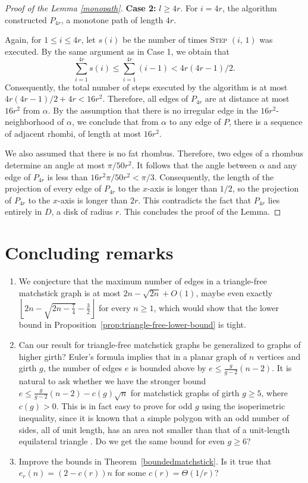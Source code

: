 \documentclass[12pt]{article}
\theoremstyle{plain}
\theoremstyle{definition}
\theoremstyle{remark}
\begin{document}
\begin{proof}[Proof of the Lemma \ref{monopath}]
\smallskip


\noindent \textbf{Case 2:} $l\ge 4r$. For $i=4r$, the algorithm  constructed $P_{4r}$, a monotone path of length $4r$.

Again, for $1\le i\le 4r$, let $s(i)$ be the number of times \textsc{Step $(i,  \, 1)$} was executed. By the same argument as in Case 1, we obtain that 
$$\sum_{i=1}^{4r}s(i)\le \sum_{i=1}^{4r}(i-1)<4r(4r-1)/2.$$
Consequently, the total number of steps executed by the algorithm is at most $4r(4r-1)/2+4r<16r^2$. Therefore, 
all edges of $P_{4r}$ are at distance at most $16r^2$ from $\alpha$. By the assumption that there is no irregular edge in the 
$16r^2$-neighborhood of $\alpha$, we conclude that from $\alpha$ to any edge of $P$, there is a sequence of adjacent rhombi, of length at most $16r^2$. 

We also assumed that there is no fat rhombus. Therefore, two edges of a rhombus determine an angle at most $\pi/50r^2$. It follows that the angle between $\alpha$ and any edge of $P_{4r}$ is less than $16r^2\pi/50r^2< \pi/3$. Consequently, the length of the projection of every edge of $P_{4r}$ to the $x$-axis is longer than $1/2$, so the projection of $P_{4r}$ to the $x$-axis is longer than $2r$. This contradicts the fact that $P_{4r}$ lies entirely in $D$, a disk of radius $r$. This concludes the proof of the Lemma. \end{proof}

\smallskip



\section{Concluding remarks}
\begin{enumerate}
\item We conjecture that the maximum number of edges in a triangle-free matchstick graph is at most $2n-\sqrt{2n}+O(1)$, maybe even exactly $\left\lfloor 2n-\sqrt{2n-\frac{7}{4}}-\frac{3}{2}\right\rfloor$ for every $n\geq 1$, which would show that the lower bound in Proposition~\ref{prop:triangle-free-lower-bound} is tight.

\item
Can our result for triangle-free matchstick graphs be generalized to graphs of higher girth?
Euler's formula implies that in a planar graph of 
$n$ vertices and 
girth $g$, the number of edges $e$ is bounded above by $e\le \frac{g}{g-2}(n-2)$.
It is natural to ask whether we have the stronger bound
$e\le \frac{g}{g-2}(n-2)-c(g)\sqrt{n}$ for matchstick graphs of girth $g\geq 5$, where $c(g) > 0$.
This is in fact easy to prove for odd $g$ using the isoperimetric inequality, since it is known that a simple polygon with an odd number of sides, all of unit length, has an area not smaller than that of a unit-length equilateral triangle \cite{BKM99}.
Do we get the same bound for even $g\geq 6$?

\item 
Improve the bounds in Theorem~\ref{boundedmatchstick}.
Is it true that $e_r(n)=(2-c(r))n$ for some $c(r)=\Theta(1/r)$?
\end{enumerate}
\end{document}
